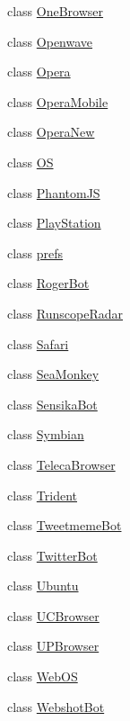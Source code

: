 \begin{DoxyCompactItemize}
class \hyperlink{classhttpagentparser_1_1_one_browser}{One\+Browser}
\item 
class \hyperlink{classhttpagentparser_1_1_openwave}{Openwave}
\item 
class \hyperlink{classhttpagentparser_1_1_opera}{Opera}
\item 
class \hyperlink{classhttpagentparser_1_1_opera_mobile}{Opera\+Mobile}
\item 
class \hyperlink{classhttpagentparser_1_1_opera_new}{Opera\+New}
\item 
class \hyperlink{classhttpagentparser_1_1_o_s}{OS}
\item 
class \hyperlink{classhttpagentparser_1_1_phantom_j_s}{Phantom\+JS}
\item 
class \hyperlink{classhttpagentparser_1_1_play_station}{Play\+Station}
\item 
class \hyperlink{classhttpagentparser_1_1prefs}{prefs}
\item 
class \hyperlink{classhttpagentparser_1_1_roger_bot}{Roger\+Bot}
\item 
class \hyperlink{classhttpagentparser_1_1_runscope_radar}{Runscope\+Radar}
\item 
class \hyperlink{classhttpagentparser_1_1_safari}{Safari}
\item 
class \hyperlink{classhttpagentparser_1_1_sea_monkey}{Sea\+Monkey}
\item 
class \hyperlink{classhttpagentparser_1_1_sensika_bot}{Sensika\+Bot}
\item 
class \hyperlink{classhttpagentparser_1_1_symbian}{Symbian}
\item 
class \hyperlink{classhttpagentparser_1_1_teleca_browser}{Teleca\+Browser}
\item 
class \hyperlink{classhttpagentparser_1_1_trident}{Trident}
\item 
class \hyperlink{classhttpagentparser_1_1_tweetmeme_bot}{Tweetmeme\+Bot}
\item 
class \hyperlink{classhttpagentparser_1_1_twitter_bot}{Twitter\+Bot}
\item 
class \hyperlink{classhttpagentparser_1_1_ubuntu}{Ubuntu}
\item 
class \hyperlink{classhttpagentparser_1_1_u_c_browser}{U\+C\+Browser}
\item 
class \hyperlink{classhttpagentparser_1_1_u_p_browser}{U\+P\+Browser}
\item 
class \hyperlink{classhttpagentparser_1_1_web_o_s}{Web\+OS}
\item 
class \hyperlink{classhttpagentparser_1_1_webshot_bot}{Webshot\+Bot}

\end{DoxyCompactItemize}
